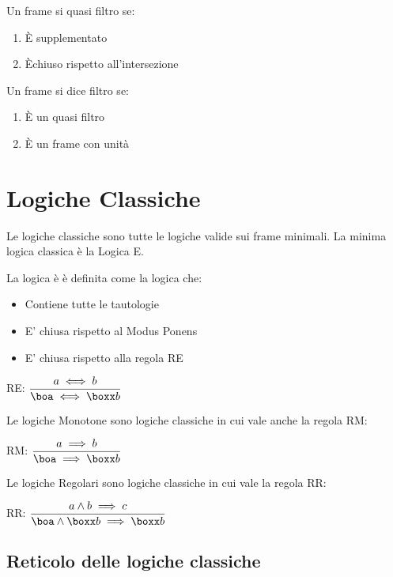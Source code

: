 Un frame si quasi filtro se:
\begin{enumerate}
\item È supplementato
\item Èchiuso rispetto all'intersezione
\end{enumerate}
Un frame si dice filtro se:
\begin{enumerate}
\item È un quasi filtro
\item È un frame con unità
\end{enumerate}

\section{Logiche Classiche}

Le logiche classiche sono tutte le logiche valide sui frame minimali.
La minima logica classica è la Logica E.

La logica è è definita come la logica che:
\begin{itemize}
\item Contiene tutte le tautologie
\item E' chiusa rispetto al Modus Ponens
\item E' chiusa rispetto alla regola RE
\end{itemize}
RE: $\dfrac{a\iff b}{\boa\iff\boxx b}$

Le logiche Monotone sono logiche classiche in cui vale anche la regola
RM:

RM: $\dfrac{a\implies b}{\boa\implies\boxx b}$

Le logiche Regolari sono logiche classiche in cui vale la regola RR:

RR: $\dfrac{a\wedge b\implies c}{\boa\wedge\boxx b\implies\boxx b}$


\subsection{Reticolo delle logiche classiche}

